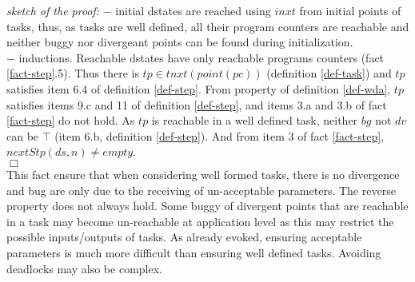 \documentclass{article}
\begin{document}
{\em sketch of the proof:} $-$ initial dstates are reached using $inxt$ from initial points of tasks, thus, as tasks are well defined, all their program counters are reachable and neither buggy nor divergeant points can be found during initialization.\\
$-$ inductions. Reachable dstates have only reachable programs counters (fact \ref{fact-step}.5). Thus there is $tp\in tnxt(point(pc))$ (definition \ref{def-task}) and $tp$ satisfies item 6.4 of definition \ref{def-step}. From property of definition \ref{def-wda}, $tp$ satisfies items 9.c and 11 of definition \ref{def-step}, and items 3.a and 3.b of fact \ref{fact-step} do not hold. As $tp$ is reachable in a well defined task, neither $bg$ not $dv$ can be $\top$ (item 6.b, definition \ref{def-step}). And from item 3 of fact \ref{fact-step}, $nextStp(ds,n)\neq empty$.\\
$\Box$\\
This fact ensure that when considering well formed tasks, there is no divergence and bug are only due to the receiving of un-acceptable parameters. The reverse property does not always hold. Some buggy of divergent points that are reachable in a task may become un-reachable at application level as this may restrict the possible inputs/outputs of tasks. As already evoked, ensuring acceptable parameters is much more difficult than ensuring well defined tasks. Avoiding deadlocks may also be complex.

\end{document}
